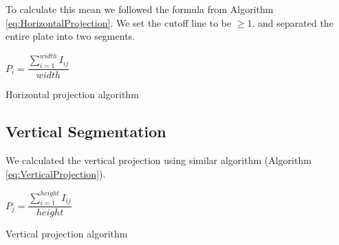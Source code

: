 \documentclass{standalone}
\begin{document}
To calculate this mean we followed the formula from Algorithm \ref{eq:HorizontalProjection}. We set the cutoff line to be $\geq 1$. and separated the entire plate into two segments. 
\begin{algorithm}
  \begin{algorithmic}
        \State $P_i = \dfrac{ \sum^{width}_{i=1}{ I_{ij} } }{ width }$
    \EndFor
  \end{algorithmic}
  \caption{Horizontal projection algorithm}
  \label{eq:HorizontalProjection}
\end{algorithm}



\subsection{Vertical Segmentation}
We calculated the vertical projection using similar algorithm (Algorithm \ref{eq:VerticalProjection}). 
\begin{algorithm}
  \begin{algorithmic}
        \State $P_j = \dfrac{ \sum^{height}_{i=1}{ I_{ij} } }{ height }$
    \EndFor
  \end{algorithmic}
  \caption{Vertical projection algorithm}
  \label{eq:VerticalProjection}
\end{algorithm}
\end{document}
